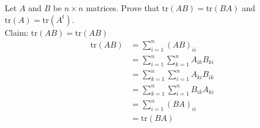 Let $A$ and $B$ be $n\times n$ matrices. Prove that $\text{tr}(AB) =
\text{tr}(BA)$ and $\text{tr}(A)=\text{tr}(A^t)$.
\\Claim: $\text{tr}(AB) = \text{tr}(AB)$
\begin{align}
\text{tr}(AB) &= \sum\limits_{i=1}^n(AB)_{ii}\\
&= \sum\limits_{i=1}^n\sum\limits_{k=1}^n A_{ik}B_{ki}\\
&= \sum\limits_{k=1}^n\sum\limits_{i=1}^n A_{ki}B_{ik}\\
&= \sum\limits_{k=1}^n\sum\limits_{i=1}^n B_{ik}A_{ki}\\
&= \sum\limits_{i=1}^n(BA)_{ii}\\
&= \text{tr}(BA)
\end{align}
